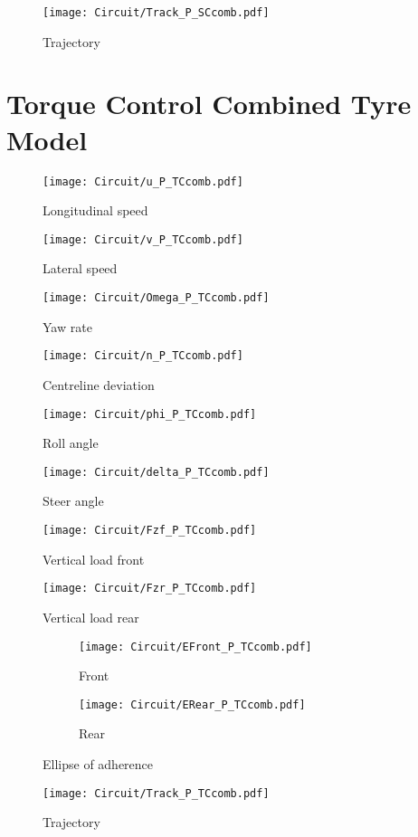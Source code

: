 %
%
\begin{figure}[!h]
    \centering
    \texttt{[image: Circuit/Track\_P\_SCcomb.pdf]}
    \caption{Trajectory}
    \label{fig:TrajSCC}
\end{figure}
%
\clearpage
%
\section{Torque Control Combined Tyre Model}
%
\begin{figure}[!h]
    \centering
    \texttt{[image: Circuit/u\_P\_TCcomb.pdf]}
    \caption{Longitudinal speed}
    \label{fig:uTCC}
\end{figure}
%
\begin{figure}[!h]
    \centering
    \texttt{[image: Circuit/v\_P\_TCcomb.pdf]}
    \caption{Lateral speed}
    \label{fig:vTCC}
\end{figure}
%
\begin{figure}[!h]
    \centering
    \texttt{[image: Circuit/Omega\_P\_TCcomb.pdf]}
    \caption{Yaw rate}
    \label{fig:OmegaTCC}
\end{figure}
%
\begin{figure}[!h]
    \centering
    \texttt{[image: Circuit/n\_P\_TCcomb.pdf]}
    \caption{Centreline deviation}
    \label{fig:nTCC}
\end{figure}
%
\begin{figure}[!h]
    \centering
    \texttt{[image: Circuit/phi\_P\_TCcomb.pdf]}
    \caption{Roll angle}
    \label{fig:phiTCC}
\end{figure}
%
\begin{figure}[!h]
    \centering
    \texttt{[image: Circuit/delta\_P\_TCcomb.pdf]}
    \caption{Steer angle}
    \label{fig:deltaTCC}
\end{figure}
%
\begin{figure}[!h]
    \centering
    \texttt{[image: Circuit/Fzf\_P\_TCcomb.pdf]}
    \caption{Vertical load front}
    \label{fig:FZFTCC}
\end{figure}
%
\begin{figure}[!h]
    \centering
    \texttt{[image: Circuit/Fzr\_P\_TCcomb.pdf]}
    \caption{Vertical load rear}
    \label{fig:FZFTCC}
\end{figure}
%
\begin{figure}[!h]
    \begin{subfigure}{0.5\linewidth}
        \texttt{[image: Circuit/EFront\_P\_TCcomb.pdf]}
        \caption{Front}
        \label{fig:FETCC}
    \end{subfigure}%
    \begin{subfigure}{0.5\linewidth}
        \texttt{[image: Circuit/ERear\_P\_TCcomb.pdf]}
        \caption{Rear}
        \label{fig:RETCC}
    \end{subfigure}
    \caption{Ellipse of adherence}
\end{figure}
%
%
\begin{figure}[!h]
    \centering
    \texttt{[image: Circuit/Track\_P\_TCcomb.pdf]}
    \caption{Trajectory}
    \label{fig:TrajTCC}
\end{figure}
%
\clearpage
%